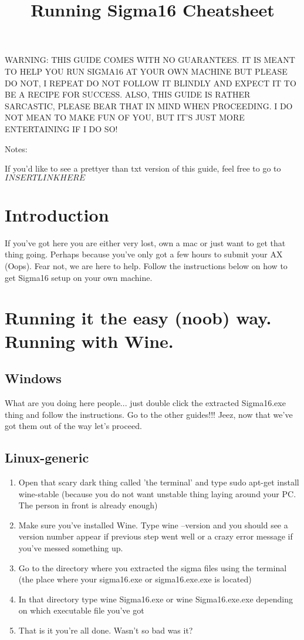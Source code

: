 \documentclass{article}
\title{Running Sigma16 Cheatsheet}
\begin{document}
\maketitle


WARNING: THIS GUIDE COMES WITH NO GUARANTEES. IT IS MEANT TO HELP YOU RUN SIGMA16 AT YOUR OWN MACHINE BUT PLEASE DO NOT, I REPEAT DO NOT FOLLOW IT BLINDLY AND EXPECT IT TO BE A RECIPE FOR SUCCESS. ALSO, THIS GUIDE IS RATHER SARCASTIC, PLEASE BEAR THAT IN MIND WHEN PROCEEDING. I DO NOT MEAN TO MAKE FUN OF YOU, BUT IT'S JUST MORE ENTERTAINING IF I DO SO!


Notes:

 If you'd like to see a prettyer than txt version of this guide, feel free to go to $INSERT LINK HERE$



\section{Introduction}

 If you've got here you are either very lost, own a mac or just want to get that thing going. Perhaps because you've only got a few hours to submit your AX (Oops). Fear not, we are here to help. Follow the instructions below on how to get Sigma16 setup on your own machine.

\section{Running it the easy (noob) way. Running with Wine.}

\setcounter{subsection}{-1}
 \subsection{Windows}
   What are you doing here people... just double click the extracted Sigma16.exe thing and follow the instructions. Go to the other guides!!! Jeez, now that we've got them out of the way let's proceed.

 \subsection{Linux-generic}
 \begin{enumerate}
      
 
   \item Open that scary dark thing called 'the terminal' and type sudo apt-get install wine-stable (because you do not want unstable thing laying around your PC. The person in front is already enough)
   \item Make sure you've installed Wine. Type wine --version and you should see a version number appear if previous step went well or a crazy error message if you've messed something up.
   \item Go to the directory where you extracted the sigma files using the terminal (the place where your sigma16.exe or sigma16.exe.exe is located)
   \item In that directory type wine Sigma16.exe or wine Sigma16.exe.exe depending on which executable file you've got
   \item That is it you're all done. Wasn't so bad was it?
\end{enumerate}
\end{document}
